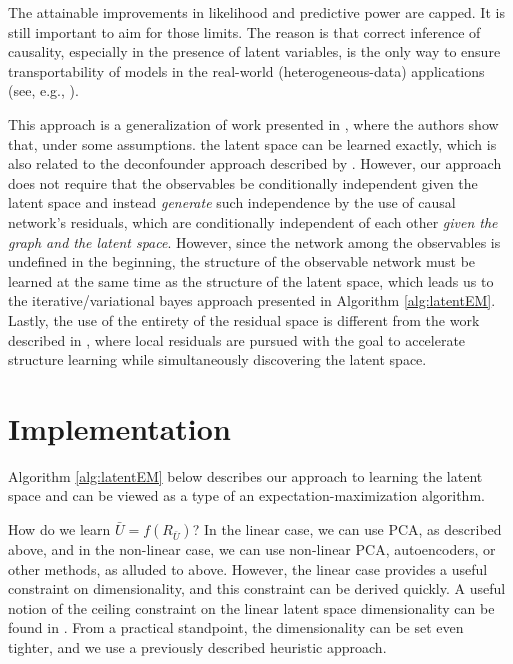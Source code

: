 \documentclass{article}
\begin{document}
The attainable improvements in likelihood and predictive power are capped.  It is still important to aim for those limits.  The reason is that correct inference of causality, especially in the presence of latent variables, is the only way to ensure transportability of models in the real-world (heterogeneous-data) applications (see, e.g., \cite{bareinboim_causal_2016}).

This approach is a generalization of work presented in \cite{anandkumar_learning_2013}, where the authors show that, under some assumptions. the latent space can be learned exactly, which is also related to the deconfounder approach described by \cite{wang_deconfounder_2019}.  However, our approach does not require that the observables be conditionally independent given the latent space and instead \textit{generate} such independence by the use of causal network's residuals, which are conditionally independent of each other \textit{given the graph and the latent space}.  However, since the network among the observables is undefined in the beginning, the structure of the observable network must be learned at the same time as the structure of the latent space, which leads us to the iterative/variational bayes approach presented in Algorithm \ref{alg:latentEM}.  Lastly, the use of the entirety of the residual space is different from the work described in \cite{elidan_ideal_2007}, where local residuals are pursued with the goal to accelerate structure learning while simultaneously discovering the latent space.

\section{Implementation}
Algorithm \ref{alg:latentEM} below describes our approach to learning the latent space and can be viewed as a type of an expectation-maximization algorithm.

How do we learn $\bar{U} = f(R_{\bar{U}})$?  In the linear case, we can use PCA, as described above, and in the non-linear case, we can use non-linear PCA, autoencoders, or other methods, as alluded to above.  However, the linear case provides a useful constraint on dimensionality, and this constraint can be derived quickly.  A useful notion of the ceiling constraint on the linear latent space dimensionality can be found in \cite{gavish_optimal_2014}.  From a practical standpoint, the dimensionality can be set even tighter, and we use a previously described heuristic approach\cite{buja_remarks_1992}.
\end{document}
